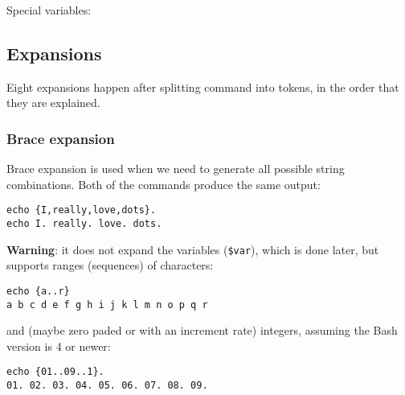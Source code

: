 Special variables:

\subsection{Expansions}
Eight expansions happen after splitting command into tokens, in the order that they are explained.

\subsubsection{Brace expansion}
Brace expansion is used when we need to generate all possible string combinations.
Both of the commands produce the same output:
\begin{verbatim}
echo {I,really,love,dots}.
echo I. really. love. dots.
\end{verbatim}

\textbf{Warning}: it does not expand the variables (\texttt{\$var}), which is done later, but supports ranges (sequences) of characters:
\begin{verbatim}
echo {a..r}
a b c d e f g h i j k l m n o p q r
\end{verbatim}

and (maybe zero paded or with an increment rate) integers, assuming the Bash version is 4 or newer:

\begin{verbatim}
echo {01..09..1}.
01. 02. 03. 04. 05. 06. 07. 08. 09.
\end{verbatim}

